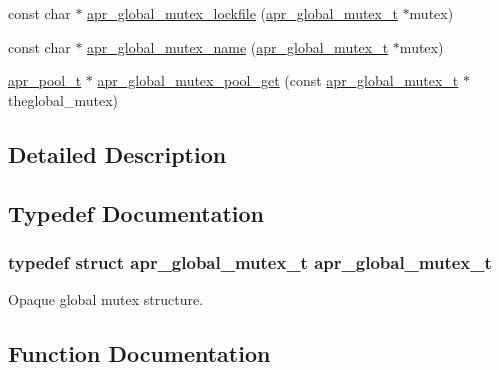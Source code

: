 \begin{DoxyCompactItemize}
\item 
const char $\ast$ \hyperlink{group___a_p_r___global_mutex_ga0d14b6c80cc39bb76f6a038fff1ef5ad}{apr\+\_\+global\+\_\+mutex\+\_\+lockfile} (\hyperlink{group___a_p_r___global_mutex_ga3fc7dc5b076533ee566aa4888ac35ee7}{apr\+\_\+global\+\_\+mutex\+\_\+t} $\ast$mutex)
\item 
const char $\ast$ \hyperlink{group___a_p_r___global_mutex_gaf4ec155e8b9c6f30a979bc0aeb3721cb}{apr\+\_\+global\+\_\+mutex\+\_\+name} (\hyperlink{group___a_p_r___global_mutex_ga3fc7dc5b076533ee566aa4888ac35ee7}{apr\+\_\+global\+\_\+mutex\+\_\+t} $\ast$mutex)
\item 
\hyperlink{group__apr__pools_gaf137f28edcf9a086cd6bc36c20d7cdfb}{apr\+\_\+pool\+\_\+t} $\ast$ \hyperlink{group___a_p_r___global_mutex_ga01d5c1bbb32b976083b9c8234b04cd46}{apr\+\_\+global\+\_\+mutex\+\_\+pool\+\_\+get} (const \hyperlink{group___a_p_r___global_mutex_ga3fc7dc5b076533ee566aa4888ac35ee7}{apr\+\_\+global\+\_\+mutex\+\_\+t} $\ast$theglobal\+\_\+mutex)
\end{DoxyCompactItemize}


\subsection{Detailed Description}


\subsection{Typedef Documentation}
\subsubsection[{\texorpdfstring{apr\+\_\+global\+\_\+mutex\+\_\+t}{apr_global_mutex_t}}]{\setlength{\rightskip}{0pt plus 5cm}typedef struct {\bf apr\+\_\+global\+\_\+mutex\+\_\+t} {\bf apr\+\_\+global\+\_\+mutex\+\_\+t}}\hypertarget{group___a_p_r___global_mutex_ga3fc7dc5b076533ee566aa4888ac35ee7}{}\label{group___a_p_r___global_mutex_ga3fc7dc5b076533ee566aa4888ac35ee7}
Opaque global mutex structure. 

\subsection{Function Documentation}
